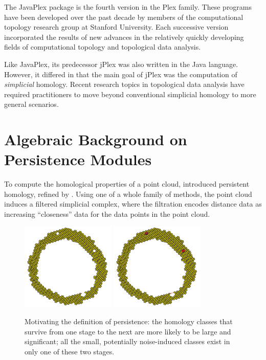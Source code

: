 \documentclass[10pt]{article}
\begin{document}
The JavaPlex package is the fourth version in the Plex family. These programs have been developed over the past decade by members of the computational topology research group at Stanford University. Each successive version incorporated the results of new advances in the relatively quickly developing fields of computational topology and topological data analysis.

Like JavaPlex, its predecessor jPlex was also written in the Java language. However, it differed in that the main goal of jPlex was the computation of \emph{simplicial} homology. Recent research topics in topological data analysis have required practitioners to move beyond conventional simplicial homology to more general scenarios.

\section{Algebraic Background on Persistence Modules}

To compute the homological properties of a point cloud,
\cite{ELZ_02} introduced persistent homology, refined by
\cite{Carlsson_04}. Using one of a whole family of methods, the point
cloud induces a filtered simplicial complex, where the filtration
encodes distance data as increasing ``closeness'' data for the data
points in the point cloud.

\begin{figure}[h]
  \centering
  \includegraphics[width=0.4\textwidth]{images/perripstwo}
  \includegraphics[width=0.4\textwidth]{images/perripsthree}
  \caption{Motivating the definition of persistence: the homology classes that survive from one stage to the next are more likely to be large and significant; all the small, potentially noise-induced classes exist in only one of these two stages.}
  \label{fig:betti3}
\end{figure}
\end{document}
